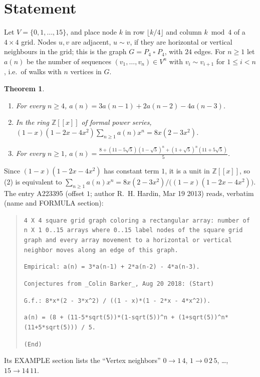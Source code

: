 \documentclass[11pt]{amsart}
\theoremstyle{plain}
\newtheorem{theorem}{Theorem}
\theoremstyle{definition}
\newcommand{\Z}{\mathbb{Z}}
\newcommand{\sq}{\mathbin{\square}}
\begin{document}
\section{Statement}\label{sec:statement}

Let $V=\{0,1,\dots,15\}$, and place node $k$ in row $\lfloor k/4\rfloor$ and column $k\bmod 4$ of a $4\times4$ grid. Nodes $u,v$ are adjacent, $u\sim v$, if they are horizontal or vertical neighbours in the grid; this is the graph $G=P_4\sq P_4$, with $24$ edges. For $n\ge1$ let $a(n)$ be the number of sequences $(v_1,\dots,v_n)\in V^n$ with $v_i\sim v_{i+1}$ for $1\le i<n$, i.e.\ of walks with $n$ vertices in $G$.

\begin{theorem}\label{thm:main}
\begin{enumerate}
\item For every $n\ge4$, $a(n)=3a(n-1)+2a(n-2)-4a(n-3)$.
\item In the ring $\Z[[x]]$ of formal power series, $\displaystyle (1-x)(1-2x-4x^2)\sum_{n\ge1}a(n)x^n=8x(2-3x^2)$.
\item For every $n\ge1$, $\displaystyle a(n)=\frac{8+(11-5\sqrt5)(1-\sqrt5)^n+(1+\sqrt5)^n(11+5\sqrt5)}{5}$.
\end{enumerate}
\end{theorem}

Since $(1-x)(1-2x-4x^2)$ has constant term $1$, it is a unit in $\Z[[x]]$, so (2) is equivalent to $\sum_{n\ge1}a(n)x^n=8x(2-3x^2)/\bigl((1-x)(1-2x-4x^2)\bigr)$.
The entry A223395 \cite{A223395} (offset $1$; author R.~H. Hardin, Mar 19 2013) reads, verbatim (name and FORMULA section):
\begin{quote}
{\small\raggedright\texttt{4 X 4 square grid graph coloring a rectangular array: number of n X 1 0..15 arrays where 0..15 label nodes of the square grid graph and every array movement to a horizontal or vertical neighbor moves along an edge of this graph.}\par\smallskip
\texttt{Empirical: a(n) = 3*a(n-1) + 2*a(n-2) - 4*a(n-3).}\par
\texttt{Conjectures from \_Colin Barker\_, Aug 20 2018: (Start)}\par
\texttt{G.f.: 8*x*(2 - 3*x\^{}2) / ((1 - x)*(1 - 2*x - 4*x\^{}2)).}\par
\texttt{a(n) = (8 + (11-5*sqrt(5))*(1-sqrt(5))\^{}n + (1+sqrt(5))\^{}n*(11+5*sqrt(5))) / 5.}\par
\texttt{(End)}\par}
\end{quote}
Its EXAMPLE section lists the ``Vertex neighbors'' $0\to1\,4$, $1\to0\,2\,5$, \dots, $15\to14\,11$.
\end{document}
